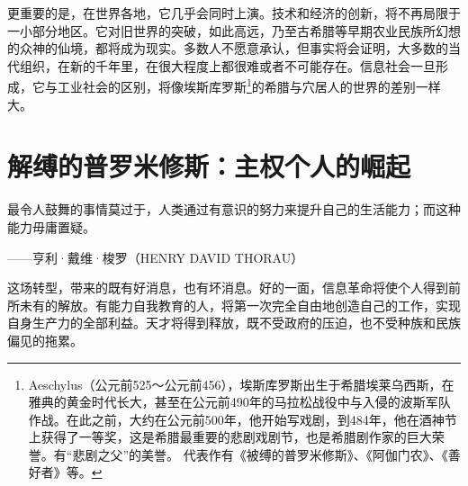 更重要的是，在世界各地，它几乎会同时上演。技术和经济的创新，将不再局限于一小部分地区。它对旧世界的突破，如此高远，乃至古希腊等早期农业民族所幻想的众神的仙境，都将成为现实。多数人不愿意承认，但事实将会证明，大多数的当代组织，在新的千年里，在很大程度上都很难或者不可能存在。信息社会一旦形成，它与工业社会的区别，将像埃斯库罗斯\footnote{Aeschylus（公元前525～公元前456），埃斯库罗斯出生于希腊埃莱乌西斯，在雅典的黄金时代长大，甚至在公元前490年的马拉松战役中与入侵的波斯军队作战。在此之前，大约在公元前500年，他开始写戏剧，到484年，他在酒神节上获得了一等奖，这是希腊最重要的悲剧戏剧节，也是希腊剧作家的巨大荣誉。有“悲剧之父”的美誉。 代表作有《被缚的普罗米修斯》、《阿伽门农》、《善好者》等。}的希腊与穴居人的世界的差别一样大。

\section{解缚的普罗米修斯：主权个人的崛起}

\begin{tcolorbox}
\kaishu 最令人鼓舞的事情莫过于，人类通过有意识的努力来提升自己的生活能力；而这种能力毋庸置疑。
\begin{flushright}
——亨利·戴维·梭罗（HENRY DAVID THORAU）
\end{flushright}
\end{tcolorbox}

这场转型，带来的既有好消息，也有坏消息。好的一面，信息革命将使个人得到前所未有的解放。有能力自我教育的人，将第一次完全自由地创造自己的工作，实现自身生产力的全部利益。天才将得到释放，既不受政府的压迫，也不受种族和民族偏见的拖累。